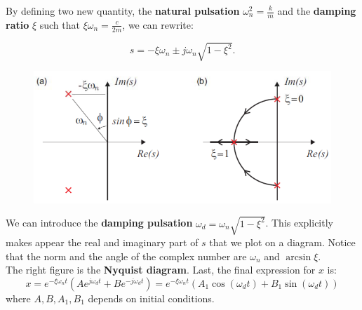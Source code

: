 			By defining two new quantity, the \textbf{natural pulsation} $\omega _n ^2 = \frac{k}{m}$ and the \textbf{damping ratio} $\xi$ such that $\xi \omega _n = \frac{c}{2m}$, we can rewrite:
			
			\begin{equation}
			s = - \xi \omega _n \pm j\omega _n \sqrt{1 -\xi ^2}.
			\end{equation}
			
			\begin{figure}
			\vspace{-5mm}
			\includegraphics[scale=0.35]{vibration/ch1/5}
			\end{figure}
			We can introduce the \textbf{damping pulsation} $\omega _d = \omega _n \sqrt{1-\xi ^2}$. This explicitly makes appear the real and imaginary part of $s$ that we plot on a diagram. Notice that the norm and the angle of the complex number are $\omega _n$ and $\arcsin \xi$. \\
			
			The right figure is the \textbf{Nyquist diagram}. Last, the final expression for $x$ is:
			\begin{equation}
			x = e^{-\xi \omega _n t} \left( Ae^{j\omega _d t}+ Be^{-j\omega _d t} \right) = e^{-\xi \omega _n t} \left( A_1\cos (\omega _d t)+ B_1 \sin (\omega _d t) \right)
			\label{eq:1.8}
			\end{equation}
			where $A,B,A_1,B_1$ depends on initial conditions. 
			
